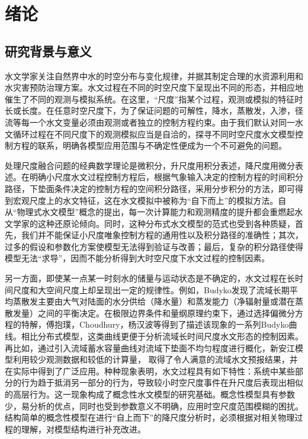 

\chapter{绪论}
\label{cha:intro}

\section{研究背景与意义}
水文学家关注自然界中水的时空分布与变化规律，并据其制定合理的水资源利用和水灾害预防治理方案。水文过程在不同的时空尺度下呈现出不同的形态，并相应地催生了不同的观测与模拟系统。在这里，``尺度''指某个过程，观测或模拟的特征时长或长度\cite{bloschl1995scale}。在任意时空尺度下，为了保证问题的可解性，降水，蒸散发，入渗，径流等每一个水文变量必须由观测或者独立的控制方程约束。由于我们默认对同一水文循环过程在不同尺度下的观测模拟应当是自洽的，探寻不同时空尺度水文模型控制方程的联系，明确各模型应用范围与不确定性便成为一个不可避免的问题。

处理尺度融合问题的经典数学理论是微积分，升尺度用积分表述，降尺度用微分表述。在明确小尺度水文过程控制方程后，根据气象输入决定的控制方程的时间积分路径，下垫面条件决定的控制方程的空间积分路径，采用分步积分的方法，即可得到宏观尺度上的水文特征，这在水文模拟中被称为``自下而上''的模拟方法。自从``物理式水文模型''概念的提出\cite{freeze1969blueprint}，每一次计算能力和观测精度的提升都会重燃起水文学家的这种还原论倾向。同时，这种分布式水文模型的范式也受到各种质疑\cite{beven1996discussion}，首先，我们并不能保证小尺度唯象控制方程的通用性\cite{swartzendruber1962non}以及积分路径的准确性\cite{gish1991preferential}；其次，过多的假设和参数化方案使模型无法得到验证与改善；最后，复杂的积分路径使得模型无法``求导''\cite{schaake1989development}，因而不能分析得到大时空尺度下水文过程的控制因素。

另一方面，即使某一点某一时刻水的储量与运动状态是不确定的，水文过程在长时间尺度和大空间尺度上却呈现出一定的规律性。例如，Budyko发现了流域长期平均蒸散发主要由大气对陆面的水分供给（降水量）和蒸发能力（净辐射量或潜在蒸散发量）之间的平衡决定\cite{budyko1961heat}。在极限边界条件和量纲原理约束下，通过选择偏微分方程的特解，傅抱璞\cite{FuBaopu}，Choudhury\cite{choudhury1999evaluation}，杨汉波\cite{yang2008new}等得到了描述该现象的一系列Budyko曲线。相比分布式模型，这类曲线更便于分析流域长时间尺度水文形态的控制因素\cite{zhang2001response,yang2007analyzing,yang2014error,li2014assessing}。
再比如，通过引入流域蓄水容量曲线对流域下垫面不均匀程度进行概化，新安江模型利用较少观测数据和较低的计算量， 取得了令人满意的流域水文预报结果，并在实际中得到了广泛应用\cite{zrj}。种种现象表明，水文过程具有如下特性：系统中某些部分的行为趋于抵消另一部分的行为，导致较小时空尺度事件在升尺度后表现出相似的高层行为\cite{hofstadter1980godel}。这一现象构成了概念性水文模型的研究基础。概念性模型具有参数少，易分析的优点，同时也受到参数意义不明确，应用时空尺度范围模糊的困扰\cite{beven1989changing}。结构简单的概念性模型在进行``自上而下''的降尺度分析时，必须根据对相关物理过程的理解，对模型结构进行补充改进。 

